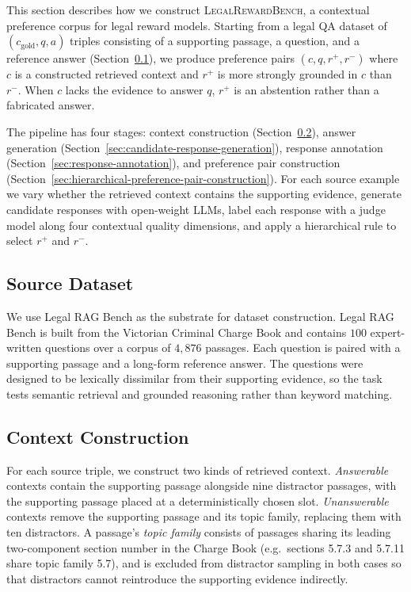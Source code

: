 \documentclass{article}
\theoremstyle{plain}
\theoremstyle{definition}
\theoremstyle{remark}
\begin{document}
This section describes how we construct \textsc{LegalRewardBench}, a contextual preference corpus for legal reward models. Starting from a legal QA dataset of $(c_{\mathrm{gold}}, q, a)$ triples consisting of a supporting passage, a question, and a reference answer (Section~\ref{sec:source-dataset}), we produce preference pairs $(c, q, r^{+}, r^{-})$ where $c$ is a constructed retrieved context and $r^{+}$ is more strongly grounded in $c$ than $r^{-}$. When $c$ lacks the evidence to answer $q$, $r^{+}$ is an abstention rather than a fabricated answer.

The pipeline has four stages: context construction (Section~\ref{sec:context-construction}), answer generation (Section~\ref{sec:candidate-response-generation}), response annotation (Section~\ref{sec:response-annotation}), and preference pair construction (Section~\ref{sec:hierarchical-preference-pair-construction}). For each source example we vary whether the retrieved context contains the supporting evidence, generate candidate responses with open-weight LLMs, label each response with a judge model along four contextual quality dimensions, and apply a hierarchical rule to select $r^{+}$ and $r^{-}$.


\subsection{Source Dataset}
\label{sec:source-dataset}

We use Legal RAG Bench \citep{butler2026legalragbenchendtoend} as the substrate for dataset construction. Legal RAG Bench is built from the Victorian Criminal Charge Book and contains $100$ expert-written questions over a corpus of $4{,}876$ passages. Each question is paired with a supporting passage and a long-form reference answer. The questions were designed to be lexically dissimilar from their supporting evidence, so the task tests semantic retrieval and grounded reasoning rather than keyword matching.

\subsection{Context Construction}
\label{sec:context-construction}

For each source triple, we construct two kinds of retrieved context. \emph{Answerable} contexts contain the supporting passage alongside nine distractor passages, with the supporting passage placed at a deterministically chosen slot. \emph{Unanswerable} contexts remove the supporting passage and its topic family, replacing them with ten distractors. A passage's \emph{topic family} consists of passages sharing its leading two-component section number in the Charge Book (e.g.\ sections 5.7.3 and 5.7.11 share topic family 5.7), and is excluded from distractor sampling in both cases so that distractors cannot reintroduce the supporting evidence indirectly.
\end{document}
